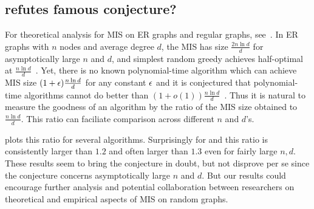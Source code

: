 \subsection{\kamis  refutes famous conjecture?}\label{sec:refute-conjecture}
For theoretical analysis for MIS on ER graphs and regular graphs, see~\citet{coja2015independent, wormald1999differential, barbier2013hard, gamarnik2014limits}. In ER graphs with $n$ nodes and average degree $d$, the  MIS has size $\frac{2n\ln d}{d}$ for asymptotically large $n$ and $d$, and simplest random greedy  achieves half-optimal at $\frac{n\ln d}{d}$~\citep{grimmett1975colouring}. Yet, there is no known polynomial-time algorithm which can achieve MIS size $(1+{\epsilon})\frac{n\ln d}{d}$ for any constant ${\epsilon}$ and it is conjectured that polynomial-time algorithms cannot do better than  $(1+o(1))\frac{n\ln d}{d}$~\citep{coja2015independent}.  Thus it is natural to measure the goodness of an algorithm by the ratio of the MIS size obtained to $\frac{n\ln d}{d}$. This ratio can faciliate comparison across different $n$ and $d$'s.

 plots this ratio for several algorithms. Surprisingly  for \redumis and \onlinemis this ratio is consistently larger than $1.2$ and often larger than $1.3$ even for fairly large $n, d$.  These results seem to bring the conjecture in doubt, but not disprove per se since the conjecture concerns asymptotically large $n$ and $d$. But  our results could encourage further analysis and potential collaboration between researchers on theoretical and empirical aspects of MIS on random graphs.
